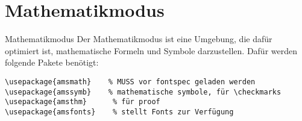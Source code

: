\section{Mathematikmodus}

\begin{frame}[fragile]{Mathematikmodus}
Der Mathematikmodus ist eine Umgebung, die dafür optimiert ist, mathematische Formeln und Symbole darzustellen. Dafür werden folgende Pakete benötigt:
\begin{lstlisting}[style=tex, mathescape]
\usepackage{amsmath}    % MUSS vor fontspec geladen werden
\usepackage{amssymb}    % mathematische symbole, für \checkmarks
\usepackage{amsthm}      % für proof
\usepackage{amsfonts}    % stellt Fonts zur Verfügung
\end{lstlisting}
\end{frame}



